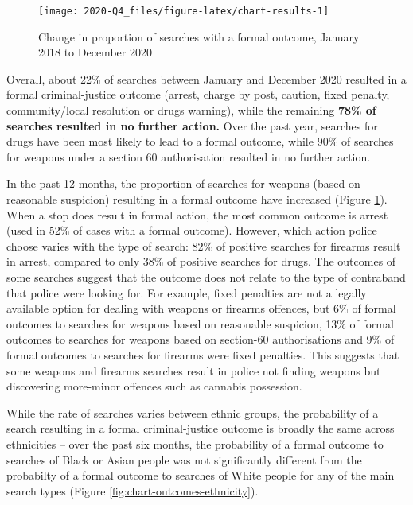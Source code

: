 \documentclass[
  a4paper,
  twoside, 11pt]{article}
\begin{document}
\begin{figure}[tb]

{\centering \texttt{[image: 2020-Q4\_files/figure-latex/chart-results-1]} 

}

\caption{Change in proportion of searches with a formal outcome, January 2018 to December 2020}\label{fig:chart-results}
\end{figure}

Overall, about 22\% of searches between January and December 2020 resulted in a formal criminal-justice outcome (arrest, charge by post, caution, fixed penalty, community/local resolution or drugs warning), while the remaining \textbf{78\% of searches resulted in no further action.} Over the past year, searches for drugs have been most likely to lead to a formal outcome, while 90\% of searches for weapons under a section 60 authorisation resulted in no further action.

In the past 12 months, the proportion of searches for weapons (based on reasonable suspicion) resulting in a formal outcome have increased (Figure \ref{fig:chart-results}). When a stop does result in formal action, the most common outcome is arrest (used in 52\% of cases with a formal outcome). However, which action police choose varies with the type of search: 82\% of positive searches for firearms result in arrest, compared to only 38\% of positive searches for drugs. The outcomes of some searches suggest that the outcome does not relate to the type of contraband that police were looking for. For example, fixed penalties are not a legally available option for dealing with weapons or firearms offences, but 6\% of formal outcomes to searches for weapons based on reasonable suspicion, 13\% of formal outcomes to searches for weapons based on section-60 authorisations and 9\% of formal outcomes to searches for firearms were fixed penalties. This suggests that some weapons and firearms searches result in police not finding weapons but discovering more-minor offences such as cannabis possession.

While the rate of searches varies between ethnic groups, the probability of a search resulting in a formal criminal-justice outcome is broadly the same across ethnicities -- over the past six months, the probability of a formal outcome to searches of Black or Asian people was not significantly different from the probabilty of a formal outcome to searches of White people for any of the main search types (Figure \ref{fig:chart-outcomes-ethnicity}).
\end{document}
